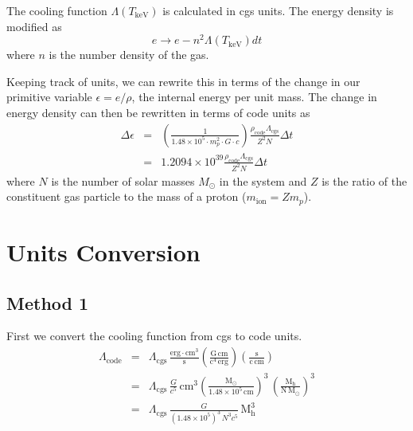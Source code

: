 The cooling function $\Lambda\left(T_\mathrm{keV}\right)$ is calculated in cgs 
units.  The energy density is modified as
\begin{equation}
   e \rightarrow e - n^2 \Lambda\left(T_\mathrm{keV}\right) dt
\end{equation}
where $n$ is the number density of the gas.

Keeping track of units, we can rewrite this in terms of the change in our primitive
variable $\epsilon=e/\rho$, the internal energy per unit mass.  The change in energy
density can then be rewritten in terms of code units as
\begin{subequations}
\begin{eqnarray}
   \Delta\epsilon &=&  \left( \frac{1}{1.48\times 10^5\cdot m_p^2\cdot G\cdot c} \right) \frac{\rho_\mathrm{code} \Lambda_\mathrm{cgs}}{Z^2 N} \Delta t \\
   &=& 1.2094 \times 10^{39} \frac{\rho_\mathrm{code} \Lambda_\mathrm{cgs}}{Z^2 N} \Delta t
\end{eqnarray}
\end{subequations}
where $N$ is the number of solar masses $M_\odot$ in the system and $Z$ is the ratio 
of the constituent gas particle to the mass of a proton ($m_\mathrm{ion} = Z m_p$).

\section{Units Conversion}

\subsection{Method 1}
First we convert the cooling function from cgs to code units.
\begin{subequations}
\begin{eqnarray}
    \Lambda_\mathrm{code} &=& \Lambda_\mathrm{cgs}\,\mathrm{ \frac{erg\cdot cm^3}{s} \left( \frac{ G \, cm }{c^4\,erg} \right) \left( \frac{s}{c \, cm} \right) } \\
       &=& \Lambda_\mathrm{cgs}\,\frac{G}{c^5}\,\mathrm{cm^3} \mathrm{ \left( \frac{M_\odot}{1.48\times 10^5\,cm} \right)^3\,\left( \frac{M_h}{N\,M_\odot} \right)^3 } \\
       &=& \Lambda_\mathrm{cgs}\,\frac{G}{(1.48\times 10^5)^3\, N^3 c^5}\,\mathrm{M_h^3}
\end{eqnarray}
\end{subequations}

